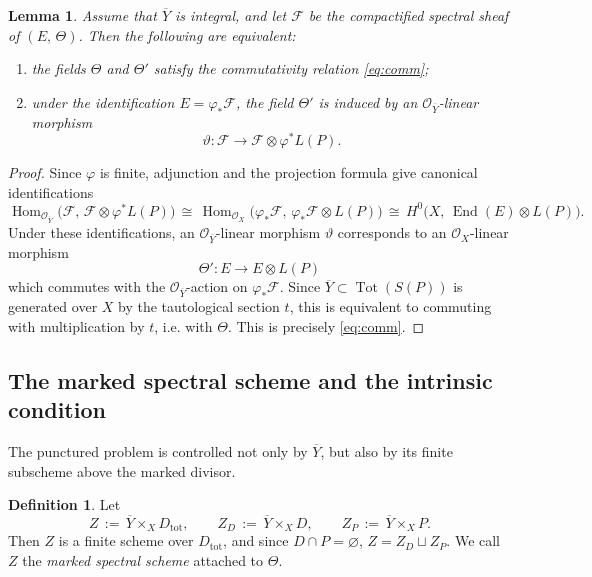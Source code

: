 \documentclass[a4paper,12pt]{amsart}
\numberwithin{equation}{section}
\newtheorem{lemma}[theorem]{Lemma}
\theoremstyle{definition}
\newtheorem{definition}[theorem]{Definition}
\newcommand{\OO}{\mathcal{O}}
\newcommand{\cF}{\mathcal{F}}
\newcommand{\End}{\operatorname{End}}
\newcommand{\Hom}{\operatorname{Hom}}
\newcommand{\Tot}{\operatorname{Tot}}
\begin{document}
\begin{lemma}\label{lem:OYlinearity}
Assume that \(\overline{Y}\) is integral, and let \(\cF\) be the compactified spectral sheaf of \((E,\,\Theta)\).  Then the following are equivalent:
\begin{enumerate}
\item[(i)] the fields \(\Theta\) and \(\Theta'\) satisfy the commutativity relation \eqref{eq:comm};
\item[(ii)] under the identification \(E=\varphi_*\cF\), the field \(\Theta'\) is induced by an \(\OO_{\overline{Y}}\)-linear morphism
\[
\vartheta:\cF\longrightarrow \cF\otimes \varphi^*L(P).
\]
\end{enumerate}
\end{lemma}
\begin{proof}
Since \(\varphi\) is finite, adjunction and the projection formula give canonical identifications
\[
\Hom_{\OO_{\overline{Y}}}\!\bigl(\cF,\,\cF\otimes \varphi^*L(P)\bigr)
\,\cong\,
\Hom_{\OO_X}\!\bigl(\varphi_*\cF,\,\varphi_*\cF\otimes L(P)\bigr)
\,\cong\,
H^0\bigl(X,\, \End(E)\otimes L(P)\bigr).
\]
Under these identifications, an \(\OO_{\overline{Y}}\)-linear morphism \(\vartheta\) corresponds to an \(\OO_X\)-linear morphism
\[
\Theta':E\longrightarrow E\otimes L(P)
\]
which commutes with the \(\OO_{\overline{Y}}\)-action on \(\varphi_*\cF\).  Since \(\overline{Y}\subset \Tot(S(P))\) is generated over \(X\) by the tautological section \(t\), this is equivalent to commuting with multiplication by \(t\), i.e. with \(\Theta\).  This is precisely \eqref{eq:comm}.
\end{proof}

\subsection{The marked spectral scheme and the intrinsic condition}

The punctured problem is controlled not only by \(\overline{Y}\), but also by its finite subscheme above the marked divisor.

\begin{definition}\label{def:marked-spectral-scheme}
Let
\[
Z\,:=\,\overline{Y}\times_X D_{\mathrm{tot}},
\qquad
Z_D\,:=\,\overline{Y}\times_X D,
\qquad
Z_P\,:=\,\overline{Y}\times_X P.
\]
Then \(Z\) is a finite scheme over \(D_{\mathrm{tot}}\), and since \(D\cap P=\varnothing\),
\(
Z=Z_D\sqcup Z_P.
\)
We call \(Z\) the \emph{marked spectral scheme} attached to \(\Theta\).
\end{definition}
\end{document}
